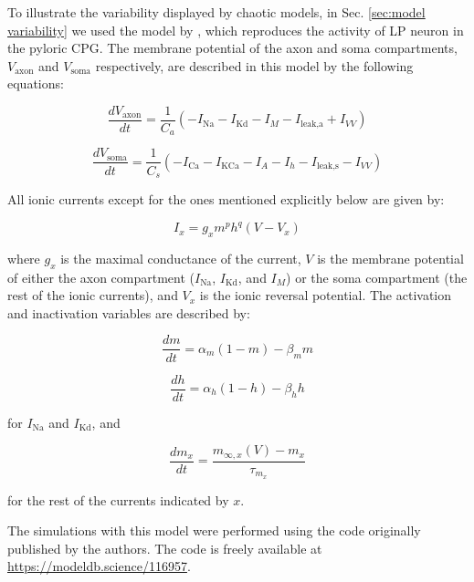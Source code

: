 To illustrate the variability displayed by chaotic models, in Sec. \ref{sec:model variability} we used the model by \textcite{nowotny_probing_2008}, which reproduces the activity of LP neuron in the pyloric CPG. The membrane potential of the axon and soma compartments, $V_{\text{axon}}$ and $V_{\text{soma}}$ respectively, are described in this model by the following equations:

\begin{equation}
	\frac{dV_{\text{axon}}}{dt} = \frac{1}{C_a} \left( -I_{\text{Na}} - I_{\text{Kd}} - I_M - I_{\text{leak,a}} + I_{VV} \right)
\end{equation}

\begin{equation}
	\frac{dV_{\text{soma}}}{dt} = \frac{1}{C_s} \left( -I_{\text{Ca}} - I_{\text{KCa}} - I_A - I_h - I_{\text{leak,s}} - I_{VV} \right)
\end{equation}

All ionic currents except for the ones mentioned explicitly below are given by:

\begin{equation}
	I_x = g_x m^p h^q (V - V_x)
\end{equation}

where $g_x$ is the maximal conductance of the current, $V$ is the membrane potential of either the axon compartment ($I_{\text{Na}}$, $I_{\text{Kd}}$, and $I_M$) or the soma compartment (the rest of the ionic currents), and $V_x$ is the ionic reversal potential. The activation and inactivation variables are described by:

\begin{equation}
	\frac{dm}{dt} = \alpha_m (1 - m) - \beta_m m
\end{equation}

\begin{equation}
	\frac{dh}{dt} = \alpha_h (1 - h) - \beta_h h
\end{equation}

for $I_{\text{Na}}$ and $I_{\text{Kd}}$, and

\begin{equation}
	\frac{dm_x}{dt} = \frac{m_{\infty,x}(V) - m_x}{\tau_{m_x}}
\end{equation}

for the rest of the currents indicated by $x$.

The simulations with this model were performed using the code originally published by the authors. The code is freely available at \href{https://modeldb.science/116957}{https://modeldb.science/116957}.

